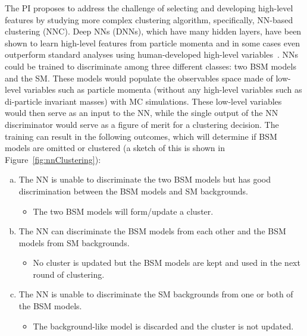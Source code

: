 \documentclass[letter, USenglish, 11pt, subfigure]{article}
\begin{document}
The PI proposes to address the challenge of selecting and developing high-level features by studying more complex clustering algorithm, specifically, NN-based clustering (NNC). Deep NNs (DNNs), which have many hidden layers, have been shown to learn high-level features from particle momenta and in some cases even outperform standard analyses using human-developed high-level variables~\cite{higgsKaggle}. NNs could be trained to discriminate among three different classes: two BSM models and the SM. These models would populate the observables space made of low-level variables such as particle momenta (without any high-level variables such as di-particle invariant masses) with MC simulations. These low-level variables would then serve as an input to the NN, while the single output of the NN discriminator would serve as a figure of merit for a clustering decision. The training can result in the following outcomes, which will determine if BSM models are omitted or clustered (a sketch of this is shown in Figure~\ref{fig:nnClustering}):
\begin{enumerate}[a.]
\item The NN is unable to discriminate the two BSM models but has good discrimination between the BSM models and SM backgrounds.
  \begin{itemize}
  \item The two BSM models will form/update a cluster.
  \end{itemize}
\item The NN can discriminate the BSM models from each other and the BSM models from SM backgrounds.
  \begin{itemize}
  \item No cluster is updated but the BSM models are kept and used in the next round of clustering. 
  \end{itemize}
\item The NN is unable to discriminate the SM backgrounds from one or both of the BSM models.
  \begin{itemize}
  \item The background-like model is discarded and the cluster is not updated. 
  \end{itemize}
\end{enumerate}
\end{document}
